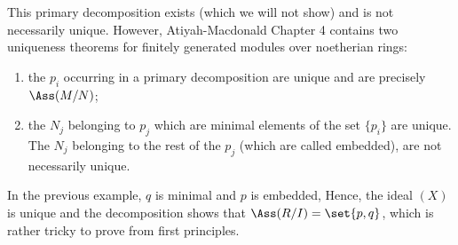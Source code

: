 This primary decomposition exists (which we will not show) and is not necessarily
unique. However, Atiyah-Macdonald Chapter 4 contains two uniqueness theorems
for finitely generated modules over noetherian rings:
\begin{enumerate}
	\item the $p_i$ occurring in a primary decomposition are unique and are
		precisely $\Ass(M/N)$;
	\item the $N_j$ belonging to $p_j$ which are minimal elements of the set
		$\{p_i\}$ are unique. The $N_j$ belonging to the rest of the $p_j$ (which
		are called embedded), are not necessarily unique.
\end{enumerate}

In the previous example, $q$ is minimal and $p$ is embedded, Hence, the ideal
$(X)$ is unique and the decomposition shows that $\Ass(R/I) = \set{p, q}$, which
is rather tricky to prove from first principles.
